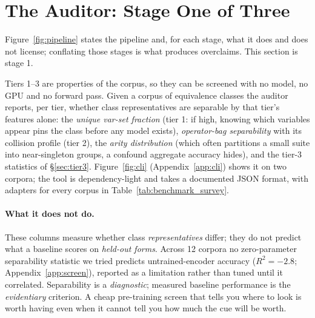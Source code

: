 \section{The Auditor: Stage One of Three}
\label{sec:auditor}

Figure~\ref{fig:pipeline} states the pipeline and, for each stage, what it does and does not
license; conflating those stages is what produces overclaims. This section is stage 1.

Tiers 1--3 are properties of the corpus, so they can be screened with no model, no GPU and no
forward pass. Given a corpus of equivalence classes the auditor reports, per tier, whether class
representatives are separable by that tier's features alone: the \emph{unique var-set fraction}
(tier 1: if high, knowing which variables appear pins the class before any model exists),
\emph{operator-bag separability} with its collision profile (tier 2), the \emph{arity distribution}
(which often partitions a small suite into near-singleton groups, a confound aggregate accuracy
hides), and the tier-3 statistics of \S\ref{sec:tier3}. Figure~\ref{fig:cli} (Appendix~\ref{app:cli}) shows it on two corpora;
the tool is dependency-light and takes a documented JSON format, with adapters for every corpus in
Table~\ref{tab:benchmark_survey}.

\paragraph{What it does not do.} These columns measure whether class \emph{representatives} differ;
they do not predict what a baseline scores on \emph{held-out forms}. Across 12 corpora no
zero-parameter separability statistic we tried predicts untrained-encoder accuracy ($R^2 = -2.8$;
Appendix~\ref{app:screen}), reported as a limitation rather than tuned until it correlated.
Separability is a \emph{diagnostic}; measured baseline performance is the \emph{evidentiary}
criterion. A cheap pre-training screen that tells you where to look is worth having even when it
cannot tell you how much the cue will be worth.
